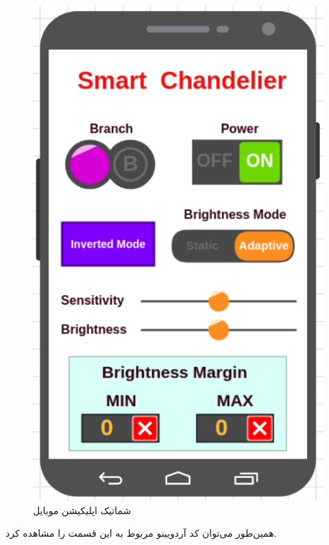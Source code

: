 \documentclass[12pt,a4paper]{article}
\begin{document}
 \begin{figure}[H]
 	\centering
 	\includegraphics[scale=0.5]{figs/shcema-ma.png}
 	\caption{
 		شماتیک اپلیکیشن موبایل
 	}
 	\label{fig:schema}
 \end{figure}
 همین‌طور می‌توان کد آردویینو مربوط به این قسمت را مشاهده کرد. 

\begin{latin}
	
\end{latin}
\end{document}
